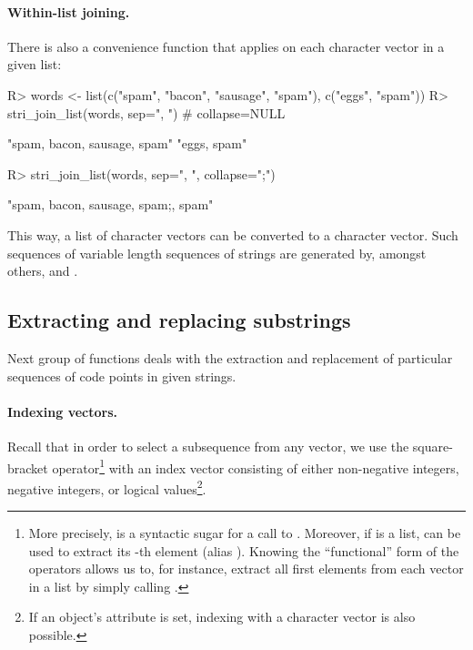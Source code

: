 \documentclass[nojss]{jss}
\begin{document}
\paragraph{Within-list joining.}
There is also a convenience function that applies 
on each character vector in a given list:

\begin{Schunk}
\begin{Sinput}
R> words <- list(c("spam", "bacon", "sausage", "spam"), c("eggs", "spam"))
R> stri_join_list(words, sep=", ")  # collapse=NULL
\end{Sinput}
\begin{Soutput}
[1] "spam, bacon, sausage, spam" "eggs, spam"
\end{Soutput}
\end{Schunk}

\ifnotJSSversion
\begin{Schunk}
\begin{Sinput}
R> stri_join_list(words, sep=", ", collapse=";\n")
\end{Sinput}
\begin{Soutput}
[1] "spam, bacon, sausage, spam;\neggs, spam"
\end{Soutput}
\end{Schunk}
\fi

\noindent
This way, a list of character vectors can be converted to
a character vector. Such sequences of variable length sequences of
strings are generated by, amongst others,
 and .






\subsection{Extracting and replacing substrings}

Next group of functions deals with the extraction and replacement
of particular sequences of code points in given strings.

\paragraph{Indexing vectors.}
Recall that in order to select a subsequence from any  vector,
we use the square-bracket operator\footnote{More precisely, 
is a syntactic sugar for a call to \code{`[`(x, i)}.
Moreover, if  is a list,  can be used to
extract its -th element (alias \code{`[[`(x, i)}).
Knowing the ``functional'' form of the operators allows us to, for instance,
extract all first elements from each vector in a list
by simply calling \code{sapply(x, "[[", 1)}.}
with an index vector consisting of either
non-negative integers, negative integers,
or logical values\footnote{If an object's  attribute is set,
indexing with a character vector is also possible.}.
\end{document}
